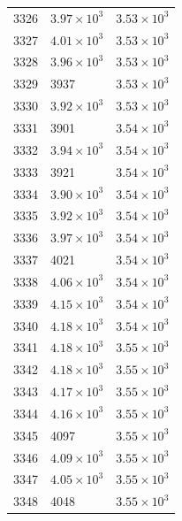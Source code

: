 \begin{table}[H]
\begin{tabular}{lll}
3326 & $\displaystyle 3.97 \times 10^{3}$ & $\displaystyle 3.53 \times 10^{3}$ \\
3327 & $\displaystyle 4.01 \times 10^{3}$ & $\displaystyle 3.53 \times 10^{3}$ \\
3328 & $\displaystyle 3.96 \times 10^{3}$ & $\displaystyle 3.53 \times 10^{3}$ \\
3329 & 3937 & $\displaystyle 3.53 \times 10^{3}$ \\
3330 & $\displaystyle 3.92 \times 10^{3}$ & $\displaystyle 3.53 \times 10^{3}$ \\
3331 & 3901 & $\displaystyle 3.54 \times 10^{3}$ \\
3332 & $\displaystyle 3.94 \times 10^{3}$ & $\displaystyle 3.54 \times 10^{3}$ \\
3333 & 3921 & $\displaystyle 3.54 \times 10^{3}$ \\
3334 & $\displaystyle 3.90 \times 10^{3}$ & $\displaystyle 3.54 \times 10^{3}$ \\
3335 & $\displaystyle 3.92 \times 10^{3}$ & $\displaystyle 3.54 \times 10^{3}$ \\
3336 & $\displaystyle 3.97 \times 10^{3}$ & $\displaystyle 3.54 \times 10^{3}$ \\
3337 & 4021 & $\displaystyle 3.54 \times 10^{3}$ \\
3338 & $\displaystyle 4.06 \times 10^{3}$ & $\displaystyle 3.54 \times 10^{3}$ \\
3339 & $\displaystyle 4.15 \times 10^{3}$ & $\displaystyle 3.54 \times 10^{3}$ \\
3340 & $\displaystyle 4.18 \times 10^{3}$ & $\displaystyle 3.54 \times 10^{3}$ \\
3341 & $\displaystyle 4.18 \times 10^{3}$ & $\displaystyle 3.55 \times 10^{3}$ \\
3342 & $\displaystyle 4.18 \times 10^{3}$ & $\displaystyle 3.55 \times 10^{3}$ \\
3343 & $\displaystyle 4.17 \times 10^{3}$ & $\displaystyle 3.55 \times 10^{3}$ \\
3344 & $\displaystyle 4.16 \times 10^{3}$ & $\displaystyle 3.55 \times 10^{3}$ \\
3345 & 4097 & $\displaystyle 3.55 \times 10^{3}$ \\
3346 & $\displaystyle 4.09 \times 10^{3}$ & $\displaystyle 3.55 \times 10^{3}$ \\
3347 & $\displaystyle 4.05 \times 10^{3}$ & $\displaystyle 3.55 \times 10^{3}$ \\
3348 & 4048 & $\displaystyle 3.55 \times 10^{3}$ \\

\end{tabular}
\end{table}
